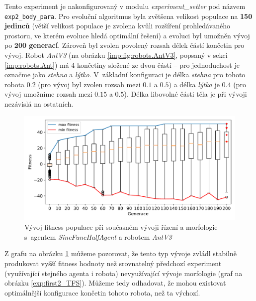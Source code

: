 Tento experiment je nakonfigurovaný v modulu \emph{experiment\_setter} pod
názvem \texttt{exp2\_body\_para}. Pro evoluční algoritmus byla zvětšena
velikost populace na \textbf{150 jedinců} (větší velikost populace je zvolena
kvůli rozšíření prohledávaného prostoru, ve kterém evoluce hledá optimální
řešení) a evoluci byl umožněn vývoj po \textbf{200 generací}. Zároveň byl
zvolen povolený rozsah délek částí končetin pro vývoj. Robot \emph{AntV3} (na
obrázku \ref{imp:fig:robots.AntV3}, popsaný v sekci \ref{imp:robots.Ant}) má 4
končetiny složené ze dvou částí -- pro jednoduchost je označme jako
\emph{stehno} a \emph{lýtko}. V~základní konfiguraci je délka \emph{stehna} pro
tohoto robota $0.2$ (pro vývoj byl zvolen rozsah mezi $0.1$ a $0.5$) a délka
\emph{lýtka} je $0.4$ (pro vývoj umožníme rozsah mezi $0.15$ a $0.5$). Délka
libovolné části těla je při vývoji nezávislá na ostatních.

\begin{figure}[h!]
    \includegraphics[width=1\textwidth]{../img/experiment2_para_10ticks.pdf}
    \caption{Vývoj fitness populace při současném vývoji řízení a morfologie
    s~agentem \emph{SineFuncHalfAgent} a robotem \emph{AntV3}}
    \label{exp:exp2_para}
\end{figure}

Z grafu na obrázku \ref{exp:exp2_para} můžeme pozorovat, že tento typ vývoje
zvládl stabilně produkovat vyšší fitness hodnoty než srovnatelný předchozí
experiment (využívající stejného agenta i robota) nevyužívající vývoje
morfologie (graf na obrázku \ref{exp:first2_TFS}). Můžeme tedy odhadovat, že
mohou existovat optimálnější konfigurace končetin tohoto robota, než ta
výchozí.

